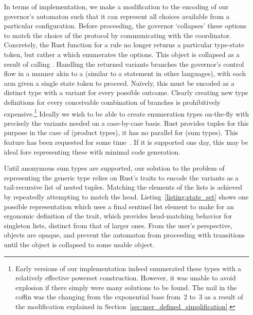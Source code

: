 In terms of implementation, we make a modification to the encoding of our governor's automaton such that it can represent all choices available from a particular configuration. Before proceeding, the governor `collapses' these options to match the choice of the protocol by communicating with the coordinator. Concretely, the Rust function for a rule no longer returns a particular type-state token, but rather a  which enumerates the options. This object is collapsed as a result of calling . Handling the returned variants branches the governor's control flow in a manner akin to a  (similar to a  statement in other languages), with each arm given a single state token to proceed. Na\"ively, this must be encoded as a distinct  type with a variant for every possible outcome. Clearly creating new type definitions for every conceivable combination of branches is prohibitively expensive.\footnote{Early versions of our implementation indeed enumerated these types with a relatively effective powerset construction. However, it was unable to avoid explosion if there simply were many solutions to be found. The nail in the coffin was the changing from the exponential base from~2 to~3 as a result of the modification explained in Section~\ref{sec:user_defined_simplification}.} Ideally we wish to be able to create enumeration types on-the-fly with precisely the variants needed on a case-by-case basis. Rust provides tuples for this purpose in the case of  (product types), it has no parallel for  (sum types). This feature has been requested for some time~\cite{anon_sum}. If it is supported one day, this may be ideal fore representing these  with minimal code generation. 

Until anonymous sum types are supported, our solution to the problem of representing the generic  type relies on Rust's traits to encode the variants as a tail-recursive list of nested tuples. Matching the elements of the lists is achieved by repeatedly attempting to match the head. Listing~\ref{listing:state_set} shows one possible representation which uses a final sentinel list element to make for an ergonomic definition of the  trait, which provides head-matching behavior for singleton lists, distinct from that of larger ones. From the user's perspective,  objects are opaque, and prevent the automaton from proceeding with transitions until the object is collapsed to some usable  object.


